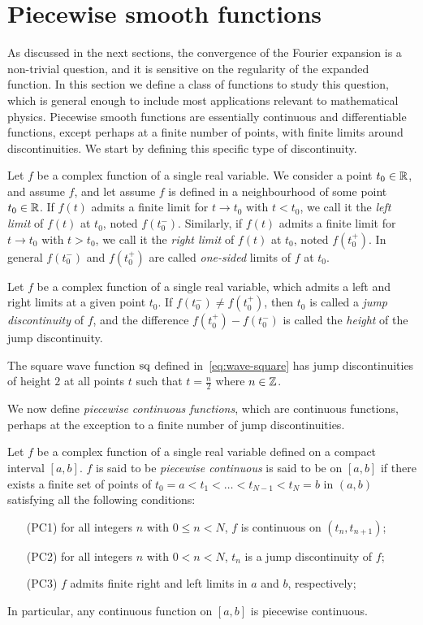 \section{Piecewise smooth functions}
As discussed in the next sections, the convergence of the Fourier expansion is a
non-trivial question, and it is sensitive on the regularity of the expanded function. In
this section we define a class of functions to study this question, which is general
enough to include most applications relevant to mathematical physics. Piecewise smooth
functions are essentially continuous and differentiable functions, except perhaps at a
finite number of points, with finite limits around discontinuities. We start by defining
this specific type of discontinuity.
\begin{definition}
  \label{def:limit-onesided}
  Let $f$ be a complex function of a single real variable. We consider a point
  $t_0\in\mathbb{R}$, and assume $f$, and let assume $f$ is defined in a neighbourhood of
  some point $t_0\in\mathbb{R}$. If $f(t)$ admits a finite limit for $t\to t_0$ with
  $t<t_0$, we call it the \emph{left limit} of $f(t)$ at $t_0$, noted $f(t_0^-)$.
  Similarly, if $f(t)$ admits a finite limit for $t\to t_0$ with $t>t_0$, we call it the
  \emph{right limit} of $f(t)$ at $t_0$, noted $f(t_0^+)$. In general $f(t_0^-)$ and
  $f(t_0^+)$ are called \emph{one-sided} limits of $f$ at $t_0$.
\end{definition}
\begin{definition}
  Let $f$ be a complex function of a single real variable, which admits a left and right
  limits at a given point $t_0$. If $f(t_0^-)\neq f(t_0^+)$, then $t_0$ is called a
  \emph{jump discontinuity} of $f$, and the difference $f(t_0^+)-f(t_0^-)$ is called the
  \emph{height} of the jump discontinuity.
\end{definition}
\begin{example}
  The square wave function $\operatorname{sq}$ defined in~\cref{eq:wave-square} has jump discontinuities
  of height $2$ at all points $t$ such that $t=\frac{n}{2}$ where $n\in\mathbb{Z}$.
\end{example}
We now define \emph{piecewise continuous functions}, which are continuous functions,
perhaps at the exception to a finite number of jump discontinuities.
\begin{definition}
  \label{def:pw-cont}
  Let $f$ be a complex function of a single real variable defined on a compact interval
  $[a,b]$. $f$ is said to be \emph{piecewise continuous} is said to be on $[a,b]$ if there
  exists a finite set of points of $t_0=a<t_1<\dots<t_{N-1}<t_N=b$ in $(a,b)$ satisfying
  all the following conditions:
  \begin{itemize}
    \item[(PC1)] for all integers $n$ with $0\leq n< N$, $f$ is continuous on
      $(t_n,t_{n+1})$;
    \item[(PC2)] for all integers $n$ with $0< n< N$, $t_n$ is a jump discontinuity of
      $f$;
    \item[(PC3)] $f$ admits finite right and left limits in $a$ and $b$, respectively;
  \end{itemize}
  In particular, any continuous function on $[a,b]$ is piecewise continuous.
\end{definition}
